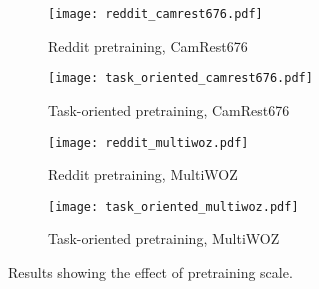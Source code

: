 \documentclass[11pt,a4paper]{article}
\begin{document}
\begin{figure*}[t]
    \centering 
    \hspace{-2em}
    \begin{subfigure}[b]{0.5\textwidth}
        \centering 
        \texttt{[image: reddit\_camrest676.pdf]}
        \vspace{-1.0em}
        \caption{Reddit pretraining, CamRest676}    
    \end{subfigure} \hspace{-2em}
    \begin{subfigure}[b]{0.5\textwidth}
        \centering 
        \texttt{[image: task\_oriented\_camrest676.pdf]}
        \vspace{-1.0em}
        \caption{Task-oriented pretraining, CamRest676}  
    \end{subfigure} \hspace{-2em}

    \begin{subfigure}[b]{0.5\textwidth}
        \centering 
        \texttt{[image: reddit\_multiwoz.pdf]}
        \vspace{-1.0em}
        \caption{Reddit pretraining, MultiWOZ}    
    \end{subfigure} \hspace{-2em}
    \begin{subfigure}[b]{0.5\textwidth}
        \centering 
        \texttt{[image: task\_oriented\_multiwoz.pdf]}
        \vspace{-1.0em}
        \caption{Task-oriented pretraining, MultiWOZ}    
    \end{subfigure}
    \vspace{-0.5em}
    \caption{Results showing the effect of pretraining scale. \label{fig:pretrain_data}}
    \vspace{-0.5em}
\end{figure*}
\end{document}

